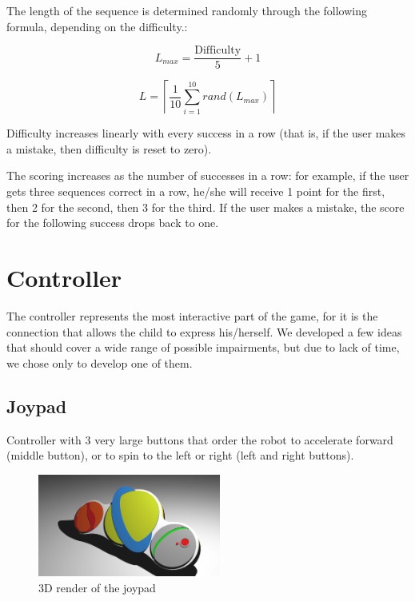 \documentclass[a4paper,twoside]{book}
\begin{document}
\begin{description}
The length of the sequence is determined randomly through the following formula, depending on the difficulty.:

\[L_{max} = \frac{\mathrm{Difficulty}}{5}+1\]

\[L = \left \lceil \frac{1}{10}\sum_{i=1}^{10} rand\left(L_{max}\right) \right \rceil\]

Difficulty increases linearly with every success in a row (that is, if the user makes a mistake, then difficulty is reset to zero).

The scoring increases as the number of successes in a row: for example, if the user gets three sequences correct in a row, he/she will receive 1 point for the first, then 2 for the second, then 3 for the third. If the user makes a mistake, the score for the following success drops back to one.
\end{description}

\section{Controller}
\label{sec:contr}

The controller represents the most interactive part of the game, for it is the connection that allows the child to express his/herself.
We developed a few ideas that should cover a wide range of possible impairments, but due to lack of time, we chose only to develop one of them.

\subsection{Joypad}
Controller with 3 very large buttons that order the robot to accelerate forward (middle button), or to spin to the left or right (left and right buttons).

\begin{figure}
 \includegraphics[width=6cm]{img/controller}
 \caption{3D render of the joypad}
\end{figure}
\end{document}
